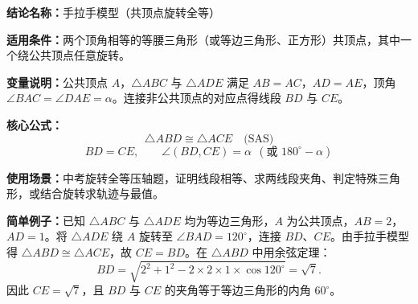 \textbf{结论名称：}手拉手模型（共顶点旋转全等）

\textbf{适用条件：}两个顶角相等的等腰三角形（或等边三角形、正方形）共顶点，其中一个绕公共顶点任意旋转。

\textbf{变量说明：}公共顶点 $A$，$\triangle ABC$ 与 $\triangle ADE$ 满足 $AB=AC$，$AD=AE$，顶角 $\angle BAC=\angle DAE=\alpha$。连接非公共顶点的对应点得线段 $BD$ 与 $CE$。

\textbf{核心公式：}
\[
\triangle ABD \cong \triangle ACE \quad \text{(SAS)}
\]
\[
\boxed{BD = CE,\qquad \angle(BD, CE) = \alpha\ \ (\text{或 } 180^\circ - \alpha)}
\]

\textbf{使用场景：}中考旋转全等压轴题，证明线段相等、求两线段夹角、判定特殊三角形，或结合旋转求轨迹与最值。

\textbf{简单例子：}已知 $\triangle ABC$ 与 $\triangle ADE$ 均为等边三角形，$A$ 为公共顶点，$AB=2$，$AD=1$。将 $\triangle ADE$ 绕 $A$ 旋转至 $\angle BAD = 120^\circ$，连接 $BD$、$CE$。由手拉手模型得 $\triangle ABD \cong \triangle ACE$，故 $CE=BD$。在 $\triangle ABD$ 中用余弦定理：
\[
BD = \sqrt{2^2 + 1^2 - 2 \times 2 \times 1 \times \cos 120^\circ} = \sqrt{7}.
\]
因此 $CE = \sqrt{7}$，且 $BD$ 与 $CE$ 的夹角等于等边三角形的内角 $60^\circ$。
